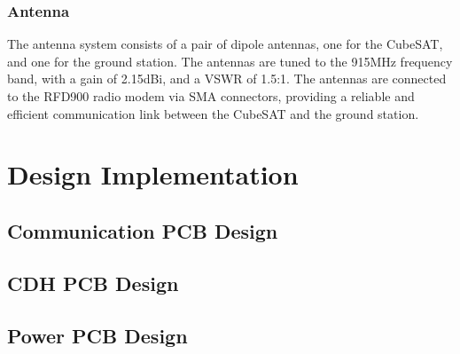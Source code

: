 \documentclass{report}
\begin{document}
            \subsection{Antenna}
                The antenna system consists of a pair of dipole antennas, one for the CubeSAT, and one for the ground station.
                The antennas are tuned to the 915MHz frequency band, with a gain of 2.15dBi, and a VSWR of 1.5:1.
                The antennas are connected to the RFD900 radio modem via SMA connectors, providing a reliable and efficient
                communication link between the CubeSAT and the ground station.
    \chapter{Design Implementation}
        \section{Communication PCB Design}
        \section{CDH PCB Design}
        \section{Power PCB Design}
\end{document}
